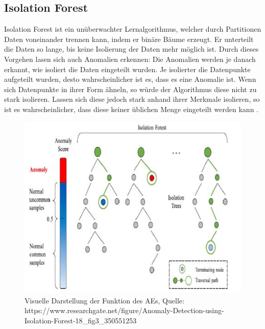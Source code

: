 \documentclass[a4paper,12pt]{article}
\begin{document}
	\subsection{Isolation Forest}
	Isolation Forest ist ein unüberwachter Lernalgorithmus, welcher durch Partitionen Daten voneinander trennen kann, indem er binäre Bäume erzeugt. Er unterteilt die Daten so lange, bis keine Isolierung der Daten mehr möglich ist. Durch dieses Vorgehen lasen sich auch Anomalien erkennen: Die Anomalien werden je danach erkannt, wie isoliert die Daten eingeteilt wurden. Je isolierter die Datenpunkte aufgeteilt wurden, desto wahrscheinlicher ist es, dass es eine Anomalie ist. Wenn sich Datenpunkte in ihrer Form ähneln, so würde der Algorithmus diese nicht zu stark isolieren. Lassen sich diese jedoch stark anhand ihrer Merkmale isolieren, so  ist es wahrscheinlicher, dass diese keiner üblichen Menge eingeteilt werden kann \cite{liu2008isolation}.
	\\[0.5em]
	\begin{figure}
		\centering
		\includegraphics[width=0.7\linewidth]{screenshot005}
		\caption{Visuelle Darstellung der Funktion des AEs, Quelle: https://www.researchgate.net/figure/Anomaly-Detection-using-Isolation-Forest-18\_fig3\_350551253}
		\label{fig:screenshot005}
	\end{figure}
	
\end{document}
